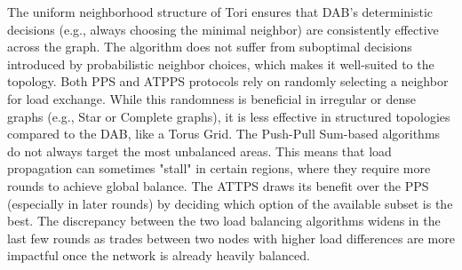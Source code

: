 The uniform neighborhood structure of Tori ensures that DAB's deterministic decisions (e.g., always choosing the minimal neighbor) are consistently effective across the graph. The algorithm does not suffer from suboptimal decisions introduced by probabilistic neighbor choices, which makes it well-suited to the topology. Both PPS and ATPPS protocols rely on randomly selecting a neighbor for load exchange. While this randomness is beneficial in irregular or dense graphs (e.g., Star or Complete graphs), it is less effective in structured topologies compared to the DAB, like a Torus Grid. The Push-Pull Sum-based algorithms do not always target the most unbalanced areas. This means that load propagation can sometimes "stall" in certain regions, where they require more rounds to achieve global balance. The ATTPS draws its benefit over the PPS (especially in later rounds) by deciding which option of the available subset is the best. The discrepancy between the two load balancing algorithms widens in the last few rounds as trades between two nodes with higher load differences are more impactful once the network is already heavily balanced.

